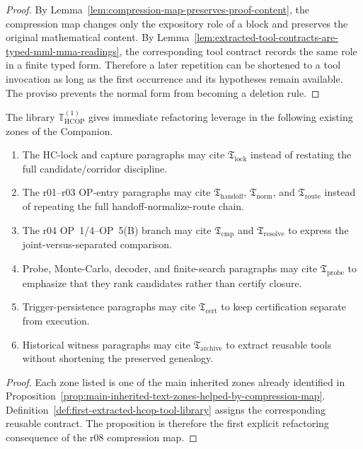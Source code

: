 \begin{proof}
By Lemma~\ref{lem:compression-map-preserves-proof-content}, the compression map changes only the expository role of a block and preserves the original mathematical content. By Lemma~\ref{lem:extracted-tool-contracts-are-typed-mml-mma-readings}, the corresponding tool contract records the same role in a finite typed form. Therefore a later repetition can be shortened to a tool invocation as long as the first occurrence and its hypotheses remain available. The proviso prevents the normal form from becoming a deletion rule.
\end{proof}

\begin{proposition}
\label{prop:where-first-tool-layer-helps-existing-text}
The library \(\mathbb T_{\mathrm{HCOP}}^{(1)}\) gives immediate refactoring leverage in the following existing zones of the Companion.
\begin{enumerate}[leftmargin=2em,label=(\roman*)]
  \item The HC-lock and capture paragraphs may cite \(\mathfrak T_{\mathrm{lock}}\) instead of restating the full candidate/corridor discipline.
  \item The r01--r03 OP-entry paragraphs may cite \(\mathfrak T_{\mathrm{handoff}}\), \(\mathfrak T_{\mathrm{norm}}\), and \(\mathfrak T_{\mathrm{route}}\) instead of repeating the full handoff-normalize-route chain.
  \item The r04 OP~1/4--OP~5(B) branch may cite \(\mathfrak T_{\mathrm{cmp}}\) and \(\mathfrak T_{\mathrm{resolve}}\) to express the joint-versus-separated comparison.
  \item Probe, Monte-Carlo, decoder, and finite-search paragraphs may cite \(\mathfrak T_{\mathrm{probe}}\) to emphasize that they rank candidates rather than certify closure.
  \item Trigger-persistence paragraphs may cite \(\mathfrak T_{\mathrm{cert}}\) to keep certification separate from execution.
  \item Historical witness paragraphs may cite \(\mathfrak T_{\mathrm{archive}}\) to extract reusable tools without shortening the preserved genealogy.
\end{enumerate}
\end{proposition}

\begin{proof}
Each zone listed is one of the main inherited zones already identified in Proposition~\ref{prop:main-inherited-text-zones-helped-by-compression-map}. Definition~\ref{def:first-extracted-hcop-tool-library} assigns the corresponding reusable contract. The proposition is therefore the first explicit refactoring consequence of the r08 compression map.
\end{proof}


